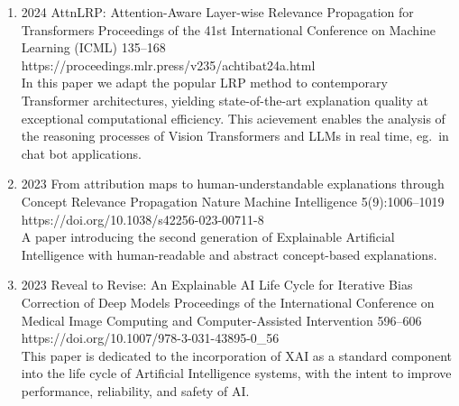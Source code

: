         \begin{enumerate}
            \item {}
                        {2024}
                        {AttnLRP: Attention-Aware Layer-wise Relevance Propagation for Transformers}
                        {Proceedings of the 41st International Conference on Machine Learning (ICML)}
                        {135--168}
                        {https://proceedings.mlr.press/v235/achtibat24a.html}
                        {
                            \\
                            In this paper we adapt the popular LRP method to contemporary Transformer architectures, yielding state-of-the-art explanation quality at exceptional computational efficiency.
                            This acievement enables the analysis of the reasoning processes of Vision Transformers and LLMs in real time, eg.\ in chat bot applications.
                        }
                        
            \item
                            {2023}
                            {From attribution maps to human-understandable explanations through Concept Relevance Propagation}
                            {Nature Machine Intelligence}
                            {5(9):1006--1019}
                            {https://doi.org/10.1038/s42256-023-00711-8}
                            {   \\
                                A paper introducing the second generation of Explainable Artificial Intelligence with human-readable and abstract concept-based explanations.
                            }
        
            \item {}
                            {2023}
                            {Reveal to Revise: An Explainable AI Life Cycle for Iterative Bias Correction of Deep Models}
                            {Proceedings of the International Conference on Medical Image Computing and Computer-Assisted Intervention}
                            {596--606}
                            {https://doi.org/10.1007/978-3-031-43895-0_56}
                            {\\
                            This paper is dedicated to the incorporation of XAI as a standard component into the life cycle of Artificial Intelligence systems, with the intent to improve performance, reliability, and safety of AI.}
                            

\end{enumerate}
